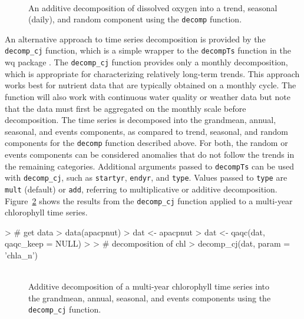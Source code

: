 \begin{figure}[!h]

{\centering \includegraphics[width=0.00\textwidth]{figure/decomp_ex1-1} 

}

\caption[An additive decomposition of dissolved oxygen into a trend, seasonal (daily), and random component using the \texttt{decomp} function]{An additive decomposition of dissolved oxygen into a trend, seasonal (daily), and random component using the \texttt{decomp} function.}\label{fig:decomp_ex1}
\end{figure}

An alternative approach to time series decomposition is provided by the \texttt{decomp\_cj} function, which is a simple wrapper to the \texttt{decompTs} function in the wq package \cite{Cloern10,Jassby14}.  The \texttt{decomp\_cj} function provides only a monthly decomposition, which is appropriate for characterizing relatively long-term trends.  This approach works best for nutrient data that are typically obtained on a monthly cycle.  The function will also work with continuous water quality or weather data but note that the data must first be aggregated on the monthly scale before decomposition.  The time series is decomposed into the grandmean, annual, seasonal, and events components, as compared to trend, seasonal, and random components for the \texttt{decomp} function described above.  For both, the random or events components can be considered anomalies that do not follow the trends in the remaining categories.  Additional arguments passed to \texttt{decompTs} can be used with \texttt{decomp\_cj}, such as \texttt{startyr}, \texttt{endyr}, and \texttt{type}.  Values passed to \texttt{type} are \texttt{mult} (default) or \texttt{add}, referring to multiplicative or additive decomposition.  Figure~\ref{fig:decomp_ex2} shows the results from the \texttt{decomp\_cj} function applied to a multi-year chlorophyll time series.

\begin{example}
> # get data
> data(apacpnut)
> dat <- apacpnut
> dat <- qaqc(dat, qaqc_keep = NULL)
> 
> # decomposition of chl
> decomp_cj(dat, param = 'chla_n')
\end{example}

\begin{figure}[!h]

{\centering \includegraphics[width=0.00\textwidth]{figure/decomp_ex2-1} 

}

\caption[Additive decomposition of a multi-year chlorophyll time series into the grandmean, annual, seasonal, and events components using the \texttt{decomp\_cj} function]{Additive decomposition of a multi-year chlorophyll time series into the grandmean, annual, seasonal, and events components using the \texttt{decomp\_cj} function.}\label{fig:decomp_ex2}
\end{figure}

